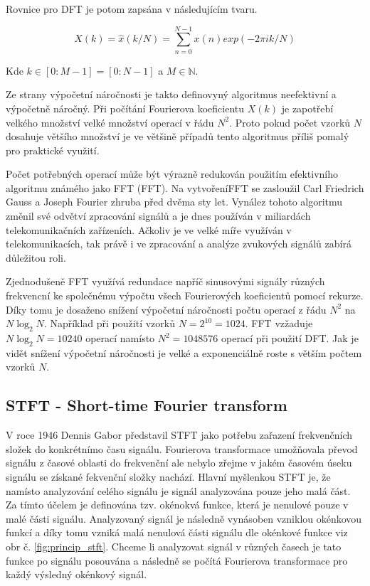  Rovnice pro \acs{DFT} je potom zapsána v následujícím tvaru. 

  \begin{equation}
    X(k) = \hat{x}(k/N) = \sum_{n = 0}^{N - 1} x(n) exp(-2 \pi i k/N)
    \label{rov:DFT}
  \end{equation}

  Kde $ k \in [0:M - 1] = [0:N - 1] $ a $ M \in \mathbb{N}$.

  Ze strany výpočetní náročnosti je takto definovyný algoritmus neefektivní a výpočetně náročný.
  Při počítání Fourierova koeficientu $X(k)$ je zapotřebí velkého množství velké množství operací v řádu $N^2$.
  Proto pokud počet vzorků $N$ dosahuje většího množství je ve většině případů tento algoritmus příliš pomalý pro praktické využití.

  Počet potřebných operací může být výrazně redukován použitím efektivního algoritmu známého jako \acs{FFT} (\acl{FFT}).
  Na vytvoření\acs{FFT} se zasloužil Carl Friedrich Gauss a Joseph Fourier zhruba před dvěma sty let.
  Vynález tohoto algoritmu změnil své odvětví zpracování signálů a je dnes používán v miliardách telekomunikačních zařízeních.
  Ačkoliv je ve velké míře využíván v telekomunikacích, tak právě i ve zpracování a analýze zvukových signálů zabírá důležitou roli.

  Zjednodušeně \acs{FFT} využívá redundace napříč sinusovými signály různých frekvencní ke společnému výpočtu všech Fourierových koeficientů pomocí rekurze.
  Díky tomu je dosaženo snížení výpočetní náročnosti počtu operací z řádu $N^2$ na $N\log_2 N$.
  Například při použití vzorků $N = 2^10 = 1024$. \acs{FFT} vzžaduje $N\log_2N = 10240 $ operací namísto
  $N^2 = 1048576$ operací při použití \acs{DFT}. Jak je vidět snížení výpočetní náročnosti je velké a exponenciálně roste s větším počtem vzorků $N$.
  
  \subsection{STFT - Short-time Fourier transform}

  V roce 1946 Dennis Gabor představil \acs{STFT} jako potřebu zařazení frekvenčních složek do konkrétnímo času signálu.
  Fourierova transformace umožňovala převod signálu z časové oblasti do frekvenční ale nebylo zřejme v jakém časovém úseku signálu se získané fekvenční složky nachází.
  Hlavní myšlenkou \acs{STFT} je, že namísto analyzování celého signálu je signál analyzována pouze jeho malá část.
  Za tímto účelem je definována tzv. okénokvá funkce, která je nenulové pouze v malé části signálu.
  Analyzovaný signál je následně vynásoben vzniklou okénkovou funkcí a díky tomu vzniká malá nenulová části signálu dle okénkové funkce viz obr č. \ref*{fig:princip_stft}.
  Chceme li analyzovat signál v různých časech je tato funkce po signálu posouvána a následně se počítá Fourierova transformace pro každý výsledný okénkový signál.

